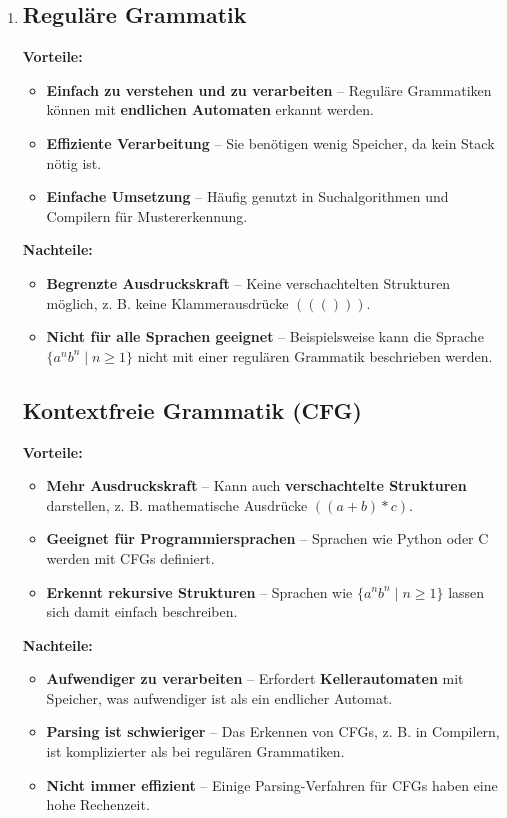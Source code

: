 \documentclass[a4paper,12pt]{article}
\begin{document}
\begin{enumerate}
		\item \subsection*{Reguläre Grammatik}
		\textbf{Vorteile:}
		\begin{itemize}
			\item \textbf{Einfach zu verstehen und zu verarbeiten} – Reguläre Grammatiken können mit \textbf{endlichen Automaten} erkannt werden.
			\item \textbf{Effiziente Verarbeitung} – Sie benötigen wenig Speicher, da kein Stack nötig ist.
			\item \textbf{Einfache Umsetzung} – Häufig genutzt in Suchalgorithmen und Compilern für Mustererkennung.
		\end{itemize}
		
		\textbf{Nachteile:}
		\begin{itemize}
			\item \textbf{Begrenzte Ausdruckskraft} – Keine verschachtelten Strukturen möglich, z. B. keine Klammerausdrücke $((()))$.
			\item \textbf{Nicht für alle Sprachen geeignet} – Beispielsweise kann die Sprache $\{ a^n b^n \mid n \geq 1 \}$ nicht mit einer regulären Grammatik beschrieben werden.
		\end{itemize}
		
		\subsection*{Kontextfreie Grammatik (CFG)}
		\textbf{Vorteile:}
		\begin{itemize}
			\item \textbf{Mehr Ausdruckskraft} – Kann auch \textbf{verschachtelte Strukturen} darstellen, z. B. mathematische Ausdrücke $((a + b) * c)$.
			\item \textbf{Geeignet für Programmiersprachen} – Sprachen wie Python oder C werden mit CFGs definiert.
			\item \textbf{Erkennt rekursive Strukturen} – Sprachen wie $\{ a^n b^n \mid n \geq 1 \}$ lassen sich damit einfach beschreiben.
		\end{itemize}
		
		\textbf{Nachteile:}
		\begin{itemize}
			\item \textbf{Aufwendiger zu verarbeiten} – Erfordert \textbf{Kellerautomaten} mit Speicher, was aufwendiger ist als ein endlicher Automat.
			\item \textbf{Parsing ist schwieriger} – Das Erkennen von CFGs, z. B. in Compilern, ist komplizierter als bei regulären Grammatiken.
			\item \textbf{Nicht immer effizient} – Einige Parsing-Verfahren für CFGs haben eine hohe Rechenzeit.
		\end{itemize}
		

\end{enumerate}
\end{document}
